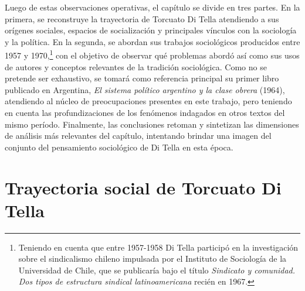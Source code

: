 Luego de estas observaciones operativas, el capítulo se divide en tres partes. En la primera, se reconstruye la trayectoria de Torcuato Di Tella atendiendo a sus orígenes sociales, espacios de socialización y principales vínculos con la sociología y la política. En la segunda, se abordan sus trabajos sociológicos producidos entre 1957 y 1970,\footnote{Teniendo en cuenta que entre 1957-1958 Di Tella participó en la investigación sobre el sindicalismo chileno impulsada por el Instituto de Sociología de la Universidad de Chile, que se publicaría bajo el título \emph{Sindicato y comunidad. Dos tipos de estructura sindical latinoamericana} recién en 1967.} con el objetivo de observar qué problemas abordó así como sus usos de autores y conceptos relevantes de la tradición sociológica. Como no se pretende ser exhaustivo, se tomará como referencia principal su primer libro publicado en Argentina, \emph{El sistema político argentino y la clase obrera} (1964), atendiendo al núcleo de preocupaciones presentes en este trabajo, pero teniendo en cuenta las profundizaciones de los fenómenos indagados en otros textos del mismo período. Finalmente, las conclusiones retoman y sintetizan las dimensiones de análisis más relevantes del capítulo, intentando brindar una imagen del conjunto del pensamiento sociológico de Di Tella en esta época.

\section{Trayectoria social de Torcuato Di Tella}

